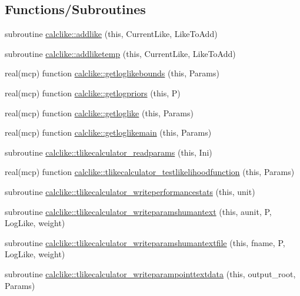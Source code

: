 \subsection*{Functions/\+Subroutines}
\begin{DoxyCompactItemize}
\item 
subroutine \mbox{\hyperlink{namespacecalclike_a36076b04960c7a7230a45fc468f9f0d6}{calclike\+::addlike}} (this, Current\+Like, Like\+To\+Add)
\item 
subroutine \mbox{\hyperlink{namespacecalclike_adb9f063355d18b2a50d8e0d3c061324b}{calclike\+::addliketemp}} (this, Current\+Like, Like\+To\+Add)
\item 
real(mcp) function \mbox{\hyperlink{namespacecalclike_ae4302a1d96dcdf7816b3d66125504644}{calclike\+::getloglikebounds}} (this, Params)
\item 
real(mcp) function \mbox{\hyperlink{namespacecalclike_ae8f9437d9cf6441647020ac8e419e424}{calclike\+::getlogpriors}} (this, P)
\item 
real(mcp) function \mbox{\hyperlink{namespacecalclike_a1a9de6819dc2b41653d5bf9a36bd66a1}{calclike\+::getloglike}} (this, Params)
\item 
real(mcp) function \mbox{\hyperlink{namespacecalclike_a7f2306f2a9d2d0135d6f4852f6ed3bc2}{calclike\+::getloglikemain}} (this, Params)
\item 
subroutine \mbox{\hyperlink{namespacecalclike_af377ac1f0746c42a430094fe73246012}{calclike\+::tlikecalculator\+\_\+readparams}} (this, Ini)
\item 
real(mcp) function \mbox{\hyperlink{namespacecalclike_adb41feb15d07d744bace1629aea8a5d3}{calclike\+::tlikecalculator\+\_\+testlikelihoodfunction}} (this, Params)
\item 
subroutine \mbox{\hyperlink{namespacecalclike_a5158b85ddca7d8f1b417a813bb7fe849}{calclike\+::tlikecalculator\+\_\+writeperformancestats}} (this, unit)
\item 
subroutine \mbox{\hyperlink{namespacecalclike_a7348b373c8c9138f0c694ad9969fcb66}{calclike\+::tlikecalculator\+\_\+writeparamshumantext}} (this, aunit, P, Log\+Like, weight)
\item 
subroutine \mbox{\hyperlink{namespacecalclike_afd9d4013e29fb891f656598d4b5e1b73}{calclike\+::tlikecalculator\+\_\+writeparamshumantextfile}} (this, fname, P, Log\+Like, weight)
\item 
subroutine \mbox{\hyperlink{namespacecalclike_a4be845214aaba0f4348b66c67401f78b}{calclike\+::tlikecalculator\+\_\+writeparampointtextdata}} (this, output\+\_\+root, Params)

\end{DoxyCompactItemize}
